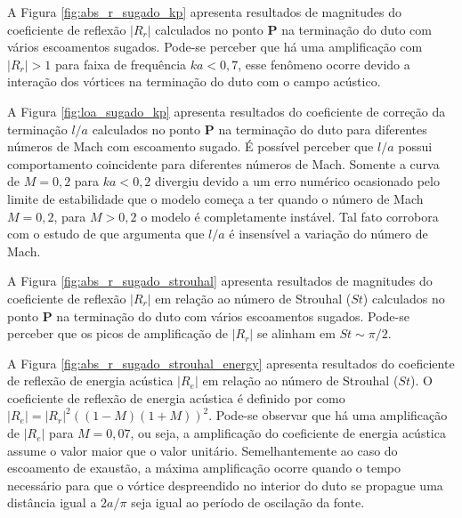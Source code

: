 \begin{figure}[ht!]
  \centering
  
\end{figure}

A Figura \ref{fig:abs_r_sugado_kp} apresenta resultados de magnitudes do coeficiente de reflexão $|R_{r}|$ calculados no ponto $\textbf{P}$ na terminação do duto com vários escoamentos sugados. Pode-se perceber que há uma amplificação com $|R_{r}| > 1$ para faixa de frequência $ka < 0,7$, esse fenômeno ocorre devido a interação dos vórtices na terminação do duto com o campo acústico.

A Figura \ref{fig:loa_sugado_kp} apresenta resultados do coeficiente de correção da terminação $l/a$ calculados no ponto $\textbf{P}$ na terminação do duto para diferentes números de Mach com escoamento sugado. É possível perceber que $l/a$ possui comportamento coincidente para diferentes números de Mach. Somente a curva de $M = 0,2$ para $ka < 0,2$ divergiu devido a um erro numérico ocasionado pelo limite de estabilidade que o modelo começa a ter quando o número de Mach $M = 0,2$, para $M > 0,2$ o modelo é completamente instável. Tal fato corrobora com o estudo de  que argumenta que $l/a$ é insensível a variação do número de Mach.  

\newpage
\begin{figure}[ht!]
  \centering
  
\end{figure}

\begin{figure}[ht!]
\centering
  
\end{figure}

 A Figura \ref{fig:abs_r_sugado_strouhal} apresenta resultados de magnitudes do coeficiente de reflexão $|R_{r}|$ em relação ao número de Strouhal ($St$) calculados no ponto $\textbf{P}$ na terminação do duto com vários escoamentos sugados. Pode-se perceber que os picos de amplificação de $|R_{r}|$ se alinham em $St \sim \pi/2$.

A Figura \ref{fig:abs_r_sugado_strouhal_energy} apresenta resultados do coeficiente de reflexão de energia acústica $|R_{e}|$ em relação ao número de Strouhal ($St$). O coeficiente de reflexão de energia acústica é definido por  como $|R_{e}| = |R_{r}|^{2}((1 - M)(1 + M))^{2}$. Pode-se observar que há uma amplificação de $|R_{e}|$ para $M = 0,07$, ou seja, a amplificação do coeficiente de energia acústica assume o valor maior que o valor unitário. Semelhantemente ao caso do escoamento de exaustão, a máxima amplificação ocorre quando o tempo necessário para que o vórtice despreendido no interior do duto se propague uma distância igual a $2a/\pi$ seja igual ao período de oscilação da fonte. 

